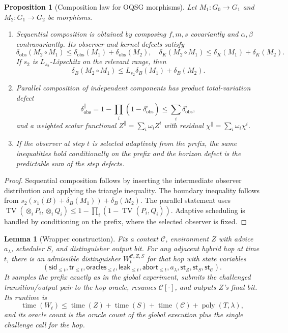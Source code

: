 \documentclass[11pt]{article}
\theoremstyle{definition}
\theoremstyle{plain}
\newtheorem{lemma}[definition]{Lemma}
\newtheorem{proposition}[definition]{Proposition}
\theoremstyle{remark}
\DeclareMathOperator{\TV}{TV}
\DeclareMathOperator{\poly}{poly}
\newcommand{\cC}{\mathcal{C}}
\begin{document}
\begin{proposition}[Composition law for OQSG morphisms]
Let $M_1:G_0\to G_1$ and $M_2:G_1\to G_2$ be morphisms.
\begin{enumerate}[leftmargin=2em]
    \item Sequential composition is obtained by composing $f,m,s$ covariantly and $\alpha,\beta$ contravariantly. Its observer and kernel defects satisfy
    \[
    \delta_{\mathrm{obs}}(M_2\circ M_1)\le\delta_{\mathrm{obs}}(M_1)+\delta_{\mathrm{obs}}(M_2),\quad
    \delta_K(M_2\circ M_1)\le\delta_K(M_1)+\delta_K(M_2).
    \]
    If $s_2$ is $L_{s_2}$-Lipschitz on the relevant range, then
    \[
    \delta_B(M_2\circ M_1)\le L_{s_2}\delta_B(M_1)+\delta_B(M_2).
    \]
    \item Parallel composition of independent components has product total-variation defect
    \[
    \delta^{\parallel}_{\mathrm{obs}}=1-\prod_i(1-\delta^i_{\mathrm{obs}})\le\sum_i\delta^i_{\mathrm{obs}},
    \]
    and a weighted scalar functional $Z^{\parallel}=\sum_i\omega_iZ^i$ with residual $\chi^{\parallel}=\sum_i\omega_i\chi^i$.
    \item If the observer at step $t$ is selected adaptively from the prefix, the same inequalities hold conditionally on the prefix and the horizon defect is the predictable sum of the step defects.
\end{enumerate}
\end{proposition}

\begin{proof}
Sequential composition follows by inserting the intermediate observer distribution and applying the triangle inequality. The boundary inequality follows from $s_2(s_1(B)+\delta_B(M_1))+\delta_B(M_2)$. The parallel statement uses $\TV(\otimes_iP_i,\otimes_iQ_i)\le1-\prod_i(1-\TV(P_i,Q_i))$. Adaptive scheduling is handled by conditioning on the prefix, where the selected observer is fixed.
\end{proof}

\begin{lemma}[Wrapper construction]
Fix a context $\cC$, environment $Z$ with advice $a_\lambda$, scheduler $S$, and distinguisher output bit. For any adjacent hybrid hop at time $t$, there is an admissible distinguisher $W^{\cC,Z,S}_t$ for that hop with state variables
\[
(\mathsf{sid}_{\le t},\mathsf{tr}_{\le t},\mathsf{oracles}_{\le t},\mathsf{leak}_{\le t},\mathsf{abort}_{\le t},a_\lambda,\mathsf{st}_Z,\mathsf{st}_S,\mathsf{st}_{\cC}).
\]
It samples the prefix exactly as in the global experiment, submits the challenged transition/output pair to the hop oracle, resumes $\cC[\cdot]$, and outputs $Z$'s final bit. Its runtime is
\[
\operatorname{time}(W_t)\le \operatorname{time}(Z)+\operatorname{time}(S)+\operatorname{time}(\cC)+\poly(T,\lambda),
\]
and its oracle count is the oracle count of the global execution plus the single challenge call for the hop.
\end{lemma}
\end{document}
